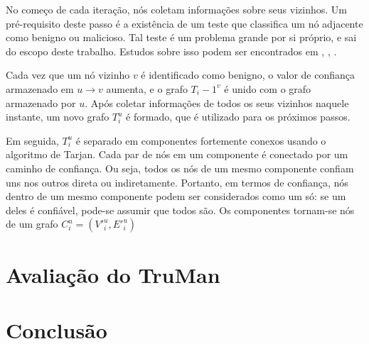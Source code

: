 \begin{resumoextendido}
	No começo de cada iteração, nós coletam informações sobre seus vizinhos.
	Um pré-requisito deste passo é a existência de um teste que classifica um nó adjacente como benigno ou malicioso.
	Tal teste é um problema grande por si próprio, e sai do escopo deste trabalho.
	Estudos sobre isso podem ser encontrados em \citep{golle2004detecting}, \citep{li2016defective}, \citep{kerrache2016detection}.
	
	Cada vez que um nó vizinho $v$ é identificado como benigno, o valor de confiança armazenado em $u \rightarrow v$ aumenta, e o grafo $T_i-1^v$ é unido com o grafo armazenado por $u$.
	Após coletar informações de todos os seus vizinhos naquele instante, um novo grafo $T_i^u$ é formado, que é utilizado para os próximos passos.
	
	Em seguida, $T_i^u$ é separado em componentes fortemente conexos usando o algoritmo de Tarjan.
	Cada par de nós em um componente é conectado por um caminho de confiança.
	Ou seja, todos os nós de um mesmo componente confiam uns nos outros direta ou indiretamente.
	Portanto, em termos de confiança, nós dentro de um mesmo componente podem ser considerados como um só: se um deles é confiável, pode-se assumir que todos são.
	Os componentes tornam-se nós de um grafo $C_i^u = (V'_i^u, E'_i^u)$
	
	
	\section*{Avaliação do TruMan}
	
	\section*{Conclusão}
\end{resumoextendido}